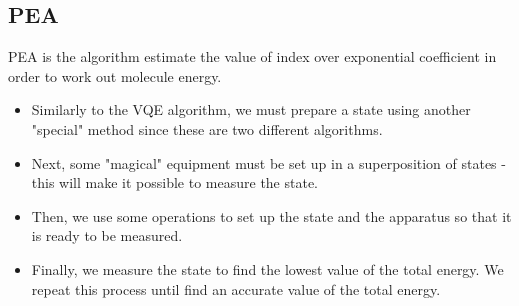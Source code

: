 \documentclass[14pt,landscape,color=UCLdarkred,margin=3cm]{uclposter}
\begin{document}
\begin{multicols}{3}
\subsection*{PEA}


PEA is the algorithm estimate the value of index over exponential coefficient in order to work out molecule energy.

\begin{highlightbox}
\begin{itemize}
\item Similarly to the VQE algorithm, we must prepare a state using another "special" method since these are two different algorithms. 
\item Next, some "magical" equipment must be set up in a superposition of states - this will make it possible to measure the state.
\item Then, we use some operations to set up the state and the apparatus so that it is ready to be measured. 
\item Finally, we measure the state to find the lowest value of the total energy. We repeat this process until find an accurate value of the total energy.
\end{itemize}
\end{highlightbox}




\end{multicols}
\end{document}
